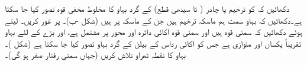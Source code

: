 \quad
دکھائیں کہ  کو ترخیم یا چادر ( تا  سیدھی قطع) کے گرد بہاو کا مخلوط مخفی قوہ تصور کیا جا سکتا ہے۔دکھائیں کہ بہاو سمت ہم ماسکہ ترخیم ہیں جن کے ماسکہ  پر ہیں (شکل -ب)۔
\quad {}\quad
{} پر غور کریں۔  لیتے ہوئے دکھائیں کہ سمتی قوہ  ہیں اور سمتی قوہ  اکائی دائرہ اور  محور پر مشتمل ہے، اور بڑے  کے لئے بہاو تقریباً یکساں اور متوازی ہے جس کو اکائی رداس کے بیلن کے گرد بہاو تصور کیا جا سکتا ہے (شکل )۔ بہاو کا نقطہ ٹھراو تلاش کریں (جہاں سمتی رفتار صفر ہو گی)۔

